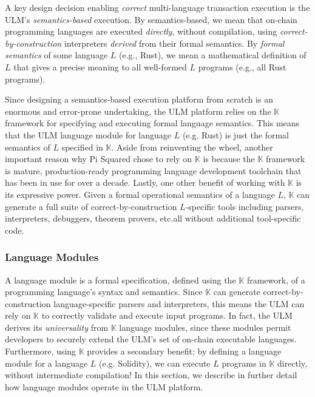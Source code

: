 \documentclass{article}
\newcommand{\ulm}{{ULM}}
\newcommand{\K}{\ensuremath{\mathbb{K}}}
\newcommand{\ps}{Pi Squared}
\begin{document}
A key design decision enabling \emph{correct} multi-language transaction execution is the \ulm{}'s \emph{semantics-based} execution.
By semantics-based, we mean that on-chain programming languages are executed \emph{directly}, without compilation, using \emph{correct-by-construction} interpreters \emph{derived} from their formal semantics.
By \emph{formal semantics} of some language $L$ (e.g., Rust), we mean a mathematical definition of $L$ that gives a precise meaning to all well-formed $L$ programs (e.g., all Rust programs).

Since designing a semantics-based execution platform from scratch is an enormous and error-prone undertaking,
the \ulm{} platform relies on the \K{} framework for specifying and executing formal language semantics.
This means that the \ulm{} language module for language $L$ (e.g. Rust) is just the formal semantics of $L$ specified in \K{}.
Aside from reinventing the wheel, another important reason why \ps{} chose to rely on \K{} is because the \K{} framework is mature, production-ready programming language development toolchain that has been in use for over a decade.
Lastly, one other benefit of working with \K{} is its expressive power.
Given a formal operational semantics of a language $L$, \K{} can generate a full suite of correct-by-construction $L$-specific tools including parsers, interpreters, debuggers, theorem provers, etc.\hspace{0.5em}all without additional tool-specific code.

\subsubsection{Language Modules}
\label{lang-mod}

A language module is a formal specification, defined using the \K{} framework, of a programming language's syntax and semantics.
Since \K{} can generate correct-by-construction language-specific parsers and interpreters, this means the \ulm{} can rely on \K{} to correctly validate and execute input programs.
In fact, the \ulm{} derives its \emph{universality} from \K{} language modules, since these modules permit developers to securely extend the \ulm's set of on-chain executable languages.
Furthermore, using \K{} provides a secondary benefit; by defining a language module for a language $L$ (e.g. Solidity), we can execute $L$ programs in \K{} directly, without intermediate compilation!
In this section, we describe in further detail how language modules operate in the \ulm{} platform.
\end{document}
